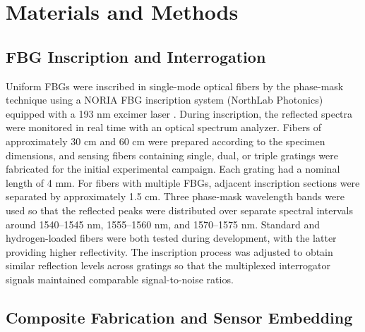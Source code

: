 \documentclass[notspecified,article,submit,pdftex,moreauthors]{Definitions/mdpi}
\begin{document}
\section{Materials and Methods}

\subsection{FBG Inscription and Interrogation}

Uniform FBGs were inscribed in single-mode optical fibers by the phase-mask technique using a NORIA FBG inscription system (NorthLab Photonics) equipped with a 193 nm excimer laser \cite{nieuwland2016}. During inscription, the reflected spectra were monitored in real time with an optical spectrum analyzer. Fibers of approximately 30 cm and 60 cm were prepared according to the specimen dimensions, and sensing fibers containing single, dual, or triple gratings were fabricated for the initial experimental campaign. Each grating had a nominal length of 4 mm. For fibers with multiple FBGs, adjacent inscription sections were separated by approximately 1.5 cm. Three phase-mask wavelength bands were used so that the reflected peaks were distributed over separate spectral intervals around 1540--1545 nm, 1555--1560 nm, and 1570--1575 nm. Standard and hydrogen-loaded fibers were both tested during development, with the latter providing higher reflectivity. The inscription process was adjusted to obtain similar reflection levels across gratings so that the multiplexed interrogator signals maintained comparable signal-to-noise ratios.

\subsection{Composite Fabrication and Sensor Embedding}
\end{document}
